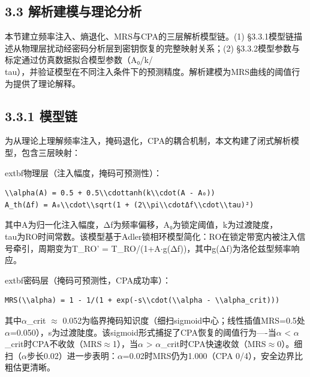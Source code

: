 \documentclass[journal]{IEEEtran}
\begin{document}
\subsection{3.3 解析建模与理论分析}

本节建立频率注入、熵退化、MRS与CPA的三层解析模型链。(1) §3.3.1模型链描述从物理层扰动经密码分析层到密钥恢复的完整映射关系；(2) §3.3.2模型参数与标定通过仿真数据拟合模型参数（A₀/k/\\tau），并验证模型在不同注入条件下的预测精度。解析建模为MRS曲线的阈值行为提供了理论解释。

\subsection{3.3.1 模型链}

为从理论上理解频率注入，掩码退化，CPA的耦合机制，本文构建了闭式解析模型，包含三层映射：

	extbf{物理层}（注入幅度，掩码可预测性）：
\begin{lstlisting}[breaklines=true]
\\alpha(A) = 0.5 + 0.5\\cdottanh(k\\cdot(A - A₀))
A_th(Δf) = A₀\\cdot\\sqrt(1 + (2\\pi\\cdotΔf\\cdot\\tau)²)
\end{lstlisting}
其中A为归一化注入幅度，Δf为频率偏移，A₀为锁定阈值，k为过渡陡度，\\tau为RO时间常数。该模型基于Adler锁相环模型简化：RO在锁定带宽内被注入信号牵引，周期变为T\_RO' = T\_RO/(1+A$\cdot$g(Δf))，其中g(Δf)为洛伦兹型频率响应。

	extbf{密码层}（掩码可预测性，CPA成功率）：
\begin{lstlisting}[breaklines=true]
MRS(\\alpha) = 1 - 1/(1 + exp(-s\\cdot(\\alpha - \\alpha_crit)))
\end{lstlisting}
其中$\alpha$\_crit $\approx$ 0.052为临界掩码知识度（细扫sigmoid中心；线性插值MRS=0.5处$\alpha$=0.050），s为过渡陡度。该sigmoid形式捕捉了CPA恢复的阈值行为----当$\alpha$ < $\alpha$\_crit时CPA不收敛（MRS$\approx$1），当$\alpha$ > $\alpha$\_crit时CPA快速收敛（MRS$\approx$0）。细扫（$\alpha$步长0.02）进一步表明：$\alpha$=0.02时MRS仍为1.000（CPA 0/4），安全边界比粗估更清晰。
\end{document}
